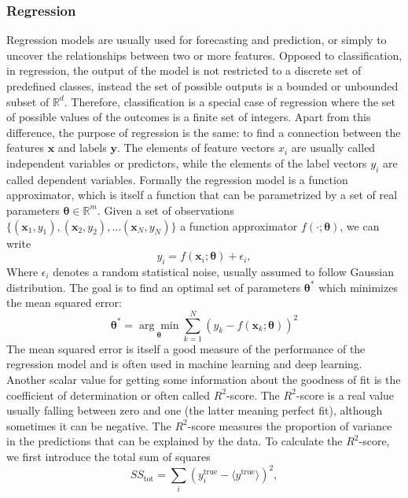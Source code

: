 \documentclass[12pt, a4paper,  nobibnotes]{article}
\begin{document}
\subsubsection{Regression}
Regression models are usually used 
for forecasting and prediction, or simply to uncover the relationships between two or more features.
Opposed to classification, in regression, the output of the model is not restricted to 
a discrete set of predefined classes, instead the set of possible outputs is a 
bounded or unbounded subset of $\mathbb R^d$. Therefore, classification is a
special case of regression where the set of possible values of the outcomes is 
a finite set of integers.
Apart from this difference, the purpose of regression is the same: to find a connection 
between the features $\mathbf x$ and labels $\mathbf y$. 
The elements of feature vectors $x_i$ are usually called independent variables or predictors, 
while the elements of the label vectors $y_i$ are called dependent variables.
Formally the regression model is a function approximator, which is itself a function that can be 
parametrized by a set of real parameters $\pmb \theta\in \mathbb R^m$. Given a set of observations 
$\{(\mathbf x_1, y_1), (\mathbf x_2, y_2), ... (\mathbf x_N, y_N)\}$ a function approximator $f(\cdot;\pmb\theta)$,
we can write
\begin{equation}
    y_i = f(\mathbf x_i; \pmb\theta) + \epsilon_i,
\end{equation}
Where $\epsilon_i$ denotes a random statistical noise, usually assumed to follow Gaussian distribution.
The goal is to find an optimal set of parameters $\pmb\theta^*$ which minimizes the mean squared 
error:
\begin{equation}
    \pmb\theta^* = \underset{\pmb\theta}{\arg\min}\sum\limits_{k=1}^N(y_k - f(\mathbf x_k;\pmb\theta))^2
\end{equation}
The mean squared error is itself a good measure of the performance of the regression model and
is often used in machine learning and deep learning. Another scalar value for 
getting some information about the 
goodness of fit is the coefficient of determination or often called $R^2$-score.
The $R^2$-score is a real value usually falling between zero and one (the latter meaning 
perfect fit), although sometimes it can be negative.
The $R^2$-score measures the proportion of variance in the predictions that can be 
explained by the data.
To calculate the $R^2$-score, we first introduce the total sum of squares
\begin{equation}
    SS_{\textrm{tot}} = \sum\limits_{i}(y^{\textrm{true}}_i-\langle y^{\textrm{true}} \rangle)^2,
\end{equation}
\end{document}
